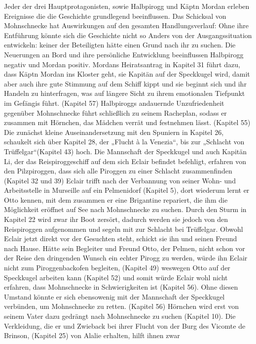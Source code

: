 Jeder der drei Hauptprotagonisten, sowie Halbpirogg und Käptn Mordan erleben Ereignisse die die Geschichte 
grundlegend beeinflussen. Das Schicksal von Mohnschnecke hat Auswirkungen auf den gesamten Handlungsverlauf: 
Ohne ihre Entführung könnte sich die Geschichte nicht so Anders von der Ausgangssituation entwickeln: keiner 
der Beteiligten hätte einen Grund nach ihr zu suchen. Die Neuerungen an Bord und ihre persönliche Entwicklung 
beeinflussen Halbpirogg negativ und Mordan positiv. Mordans Heiratsantrag in Kapitel 31 führt dazu, dass Käptn 
Mordan ins Kloster geht, sie Kapitän auf der Speckkugel wird, damit aber auch ihre gute Stimmung auf dem Schiff 
kippt und sie beginnt sich und ihr Handeln zu hinterfragen, was auf längere Sicht zu ihrem emotionalen Tiefpunkt 
im Gefängis führt. (Kapitel 57) Halbpiroggs andauernde Unzufriedenheit gegenüber Mohnschnecke führt schließlich zu 
seinem Racheplan, sodass er zusammen mit Hörnchen, das Mädchen verrät und festnehmen lässt. (Kapitel 55) 
Die zunächst kleine Auseinandersetzung mit den Spuniern in Kapitel 26, schaukelt sich über Kapitel 28, 
der „Flucht à la Venezia“, bis zur „Schlacht von Trüffelgar“(Kapitel 43) hoch. Die Mannschaft der Speckkugel 
und auch Kapitän Li, der  das Reispiroggeschiff auf dem sich Eclair befindet befehligt, erfahren von den 
Pilzpiroggen, dass sich alle Piroggen zu einer Schlacht zusammenfinden (Kapitel 32 und 39)
Eclair trifft nach der Verbannung von seiner Wohn- und Arbeitsstelle in Murseille auf ein Pelmenidorf (Kapitel 5), 
dort wiederum lernt er Otto kennen, mit dem zusammen er eine Brigantine repariert, die ihm die Möglichkeit eröffnet 
auf See nach Mohnschnecke zu suchen. Durch den Sturm in Kapitel 22 wird zwar ihr Boot zersört, dadurch werden sie 
jedoch von den Reispiroggen aufgenommen und segeln mit zur Schlacht bei Trüffelgar. Obwohl Eclair jetzt direkt vor 
der Gesuchten steht, schickt sie ihn und seinen Freund nach Hause. Hätte sein Begleiter und Freund Otto, der Pelmen, 
nicht schon vor der Reise den dringenden Wunsch ein echter Pirogg zu werden, würde ihn Eclair nicht zum 
Piroggenbackofen begleiten, (Kapitel 49) weswegen Otto auf der Speckkugel arbeiten kann (Kapitel 52) und somit 
würde Eclair wohl nicht erfahren, dass Mohnschnecke in Schwierigkeiten ist (Kapitel 56). Ohne diesen Umstand könnte 
er sich ebensowenig mit der Mannschaft der Speckkugel verbünden, um Mohnschnecke zu retten. (Kapitel 56) Hörnchen 
wird erst von seinem Vater dazu gedrängt nach Mohnschnecke zu suchen (Kapitel 10). Die Verkleidung, die er und 
Zwieback bei ihrer Flucht von der Burg des Vicomte de Brinson, (Kapitel 25) von Alalie erhalten, hilft ihnen zwar 

